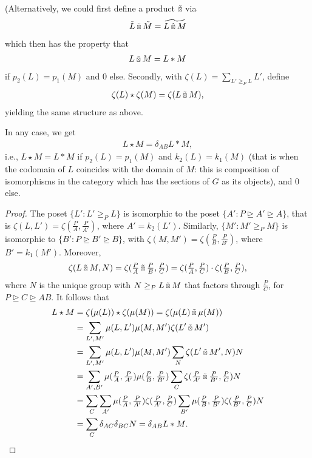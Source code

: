 \documentclass[12pt,a4paper]{amsart}
\newcommand{\kstarhat}{\mathbin{\hat{\scalebox{0.61}{$\boxtimes$}}}}
\newcommand{\kstartilde}{\mathbin{\tilde{\scalebox{0.61}{$\boxtimes$}}}}
\begin{document}
(Alternatively, we could first define a product $\kstartilde$ via
\begin{align*}
  \tilde{L} \kstartilde \tilde{M} = \widetilde{L \kstarhat M}
\end{align*}
which then has the property that
\begin{align*}
  L \kstartilde M = L * M
\end{align*}
if $p_2(L) = p_1(M)$ and $0$ else. Secondly, with $\zeta(L) = \sum_{L' \geq_P L} L'$, define
\begin{align*}
  \zeta(L) \star \zeta(M) = \zeta(L \kstartilde M),
\end{align*}
yielding the same structure as above.

In any case, we get
\begin{align*}
  L \star M = \delta_{AB} L * M,
\end{align*}
i.e., $L \star M = L * M$ if $p_2(L) = p_1(M)$ and $k_2(L) = k_1(M)$
(that is when the codomain of $L$ coincides with the domain of $M$:
this is composition of isomorphisms in the category which has the
sections of $G$ as its objects),
and $0$ else.

\begin{proof}
  The poset $\{ L' : L' \geq_P L \}$ is isomorphic to the poset $\{A' : P \unrhd A' \unrhd A \}$,
  that is $\zeta(L, L') = \zeta(\tfrac{P}{A}, \tfrac{P}{A'})$, where $A'= k_2(L')$.
  Similarly, $\{ M' : M' \geq_P M \}$ is isomorphic to
  $\{B' : P \unrhd B' \unrhd B \}$, with $\zeta(M, M') = \zeta(\tfrac{P}{B}, \tfrac{P}{B'})$, where $B'= k_1(M')$.
  Moreover,
  \begin{align*}
    \zeta(L \kstartilde M, N) = \zeta(\tfrac{P}{A} \kstartilde \tfrac{P}{B}, \tfrac{P}{C}) = \zeta(\tfrac{P}{A}, \tfrac{P}{C}) \cdot   \zeta(\tfrac{P}{B}, \tfrac{P}{C}),
  \end{align*}
  where $N$ is the unique group with $N \geq_P L \kstartilde M$ that factors through $\tfrac{P}{C}$, for $P \unrhd C \unrhd AB$.
  It follows that
  \begin{align*}
    L \star M &= \zeta(\mu(L)) \star \zeta(\mu(M))
= \zeta(\mu(L) \kstartilde \mu(M)) \\
  & = \sum_{L',M'} \mu(L, L') \mu(M, M') \zeta(L' \kstartilde M') \\
  & = \sum_{L',M'} \mu(L, L') \mu(M, M') \sum_{N} \zeta(L' \kstartilde M', N) N \\
  & = \sum_{A',B'} \mu(\tfrac{P}{A}, \tfrac{P}{A'}) \mu(\tfrac{P}{B}, \tfrac{P}{B'})
    \sum_C \zeta(\tfrac{P}{A'} \kstartilde \tfrac{P}{B'}, \tfrac{P}{C}) N \\
  & = \sum_C \sum_{A'} \mu(\tfrac{P}{A}, \tfrac{P}{A'}) \zeta(\tfrac{P}{A'}, \tfrac{P}{C})
    \sum_{B'} \mu(\tfrac{P}{B}, \tfrac{P}{B'}) \zeta(\tfrac{P}{B'}, \tfrac{P}{C}) N \\
    & = \sum_C \delta_{AC} \delta_{BC} N = \delta_{AB} L * M\text.
  \end{align*}
\end{proof}
\end{document}
